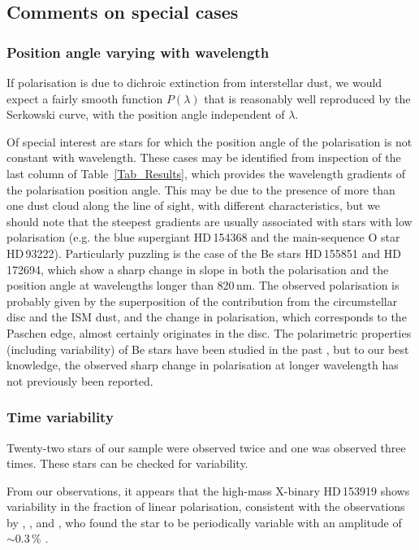 \documentclass[a4paper]{aa}
\newcommand{\pl}{\ensuremath{P}}
\begin{document}
\subsection{Comments on special cases}

\subsubsection{Position angle varying with wavelength}
If polarisation is due to dichroic extinction from
interstellar dust, we would expect a fairly smooth function
$\pl(\lambda)$ that is reasonably well reproduced by the Serkowski curve, with
the position angle independent of $\lambda$. 

Of special interest are stars for which the position angle of
the polarisation is not constant with wavelength. These cases may be
identified from inspection of the last column of
Table~\ref{Tab_Results}, which provides the wavelength gradients of
the polarisation position angle. This may be due to the presence of
more than one dust cloud along the line of sight, with different
characteristics, but we should note that the steepest gradients are
usually associated with stars with low polarisation (e.g. the blue
supergiant HD\,154368 and the main-sequence O star HD\,93222).
Particularly puzzling is the case of the Be stars HD\,155851 and
HD\,172694, which show a sharp change in slope in both the
polarisation and the position angle at wavelengths longer than
820\,nm. The observed polarisation is probably given by the
superposition of the contribution from the circumstellar disc and the
ISM dust, and the change in polarisation, which corresponds to the
Paschen edge, almost certainly originates in the disc. The
polarimetric properties (including variability) of Be stars have been
studied in the past \citep[e.g.][]{Bjorkman94}, but to our best
knowledge, the observed sharp change in polarisation at longer
wavelength has not previously been reported.

\subsubsection{Time variability}\label{Sect_TimeVar}
Twenty-two stars of our sample were observed twice and one was
observed three times. These stars can be checked for variability.

From our observations, it appears that the high-mass X-binary
HD\,153919 shows variability in the fraction of linear polarisation,
consistent with the observations by \citet{van80}, \citet{Oesetal82},
and \citet{DolTap84}, who found the star to be periodically variable with
an amplitude of $\sim 0.3$\,\% .
\end{document}
